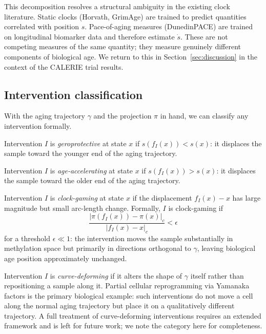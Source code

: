 This decomposition resolves a structural ambiguity in the existing clock literature.
Static clocks (Horvath, GrimAge) are trained to predict quantities correlated with
position $s$. Pace-of-aging measures (DunedinPACE) are trained on longitudinal
biomarker data and therefore estimate $\dot{s}$. These are not competing measures
of the same quantity; they measure genuinely different components of biological age.
We return to this in Section~\ref{sec:discussion} in the context of the CALERIE
trial results.

\subsection{Intervention classification}
\label{sec:classification}

With the aging trajectory $\gamma$ and the projection $\pi$ in hand, we can classify
any intervention formally.

\begin{definition}
Intervention $I$ is \emph{geroprotective} at state $x$ if
$s(f_I(x)) < s(x)$: it displaces the sample toward the younger end of the aging
trajectory.
\end{definition}

\begin{definition}
Intervention $I$ is \emph{age-accelerating} at state $x$ if
$s(f_I(x)) > s(x)$: it displaces the sample toward the older end of the aging
trajectory.
\end{definition}

\begin{definition}
Intervention $I$ is \emph{clock-gaming} at state $x$ if the displacement
$f_I(x) - x$ has large magnitude but small arc-length change. Formally, $I$ is
clock-gaming if
\begin{equation}
  \frac{|\pi(f_I(x)) - \pi(x)|_c}{|f_I(x) - x|_c} < \epsilon
  \label{eq:clockgaming}
\end{equation}
for a threshold $\epsilon \ll 1$: the intervention moves the sample substantially
in methylation space but primarily in directions orthogonal to $\gamma$, leaving
biological age position approximately unchanged.
\end{definition}

\begin{definition}
Intervention $I$ is \emph{curve-deforming} if it alters the shape of $\gamma$
itself rather than repositioning a sample along it. Partial cellular reprogramming
via Yamanaka factors is the primary biological example: such interventions do not
move a cell along the normal aging trajectory but place it on a qualitatively
different trajectory. A full treatment of curve-deforming interventions requires
an extended framework and is left for future work; we note the category here for
completeness.
\end{definition}

